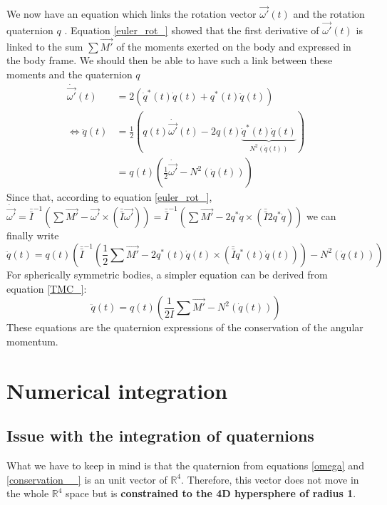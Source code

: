 \documentclass[class=report, float=false, crop=false]{standalone}
\begin{document}
We now have an equation which links the rotation vector $\vec{\omega'}(t)$ and the rotation quaternion $q$ \cite{mandre}. Equation \ref{euler_rot_} showed that the first derivative of $\vec{\omega'}(t)$ is linked to the sum $\sum \vec{M'}$ of the moments exerted on the body and expressed in the body frame. We should then be able to have such a link between these moments and the quaternion $q$
\begin{align*}
\dot{\vec{\omega'}}(t) &= 2(\dot{q}^*(t)\dot{q}(t) + q^*(t)\ddot{q}(t))\\
\Leftrightarrow \ddot{q}(t) &= \frac{1}{2}(q(t)\dot{\vec{\omega'}}(t) - 2q(t)\underbrace{\dot{q}^*(t)\dot{q}(t)}_{N^2(\dot{q}(t))})\\
&= q(t)\left(\frac{1}{2}\dot{\vec{\omega'}} - N^2(\dot{q}(t))\right)
\end{align*}
Since that, according to equation \ref{euler_rot_}, $\dot{\vec{\omega'}} = \bar{\bar{I}}^{-1}\left(\sum\vec{M'} - \vec{\omega'}\times(\bar{\bar{I}}\vec{\omega'})\right) = \bar{\bar{I}}^{-1}\left(\sum\vec{M'} - 2q^*\dot{q}\times(\bar{\bar{I}}2q^*\dot{q})\right)$ we can finally write
\begin{equation}
\boxed{\ddot{q}(t) = q(t)\left(\bar{\bar{I}}^{-1}\left(\frac{1}{2}\sum\vec{M'} - 2q^*(t)\dot{q}(t)\times\left(\bar{\bar{I}}q^*(t)\dot{q}(t)\right)\right) - N^2(\dot{q}(t))\right)}
\label{conservation__}
\end{equation}
For spherically symmetric bodies, a simpler equation can be derived from equation \ref{TMC_}:
\begin{equation}
\boxed{\ddot{q}(t) = q(t)\left(\frac{1}{2I}\sum\vec{M'} - N^2(\dot{q}(t))\right)}
\end{equation}
These equations are the quaternion expressions of the conservation of the angular momentum.

\section{Numerical integration}

\subsection{Issue with the integration of quaternions}
\label{Kleppmann}

What we have to keep in mind is that the quaternion from equations \ref{omega} and \ref{conservation__} is an unit vector of $\mathbb{R}^4$. Therefore, this vector does not move in the whole $\mathbb{R}^4$ space but is \textbf{constrained to the 4D hypersphere of radius 1}.\\
\end{document}
